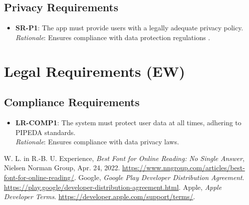 \documentclass[]{article}
\begin{document}
\subsection{Privacy Requirements}
\begin{itemize}
    \item \textbf{SR-P1}: The app must provide users with a legally adequate privacy policy. \\ 
    \textit{Rationale}: Ensures compliance with data protection regulations \cite{googleprivacy2025, appleterms2025}.
\end{itemize}

\section{Legal Requirements (EW)}
\subsection{Compliance Requirements}
\begin{itemize}
    \item \textbf{LR-COMP1}: The system must protect user data at all times, adhering to PIPEDA standards. \\ 
    \textit{Rationale}: Ensures compliance with data privacy laws.
\end{itemize}

\begin{thebibliography}{9}
     W. L. in R.-B. U. Experience, \textit{Best Font for Online Reading: No Single Answer}, Nielsen Norman Group, Apr. 24, 2022. \url{https://www.nngroup.com/articles/best-font-for-online-reading/}.
     Google, \textit{Google Play Developer Distribution Agreement}. \url{https://play.google/developer-distribution-agreement.html}.
     Apple, \textit{Apple Developer Terms}. \url{https://developer.apple.com/support/terms/}.
\end{thebibliography}
\end{document}
